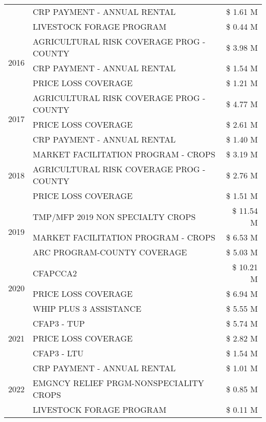 \begin{tabular}{llr}
 & CRP PAYMENT - ANNUAL RENTAL & \$ 1.61 M \\
 & LIVESTOCK FORAGE PROGRAM & \$ 0.44 M \\
\cline{1-3}
\multirow[t]{3}{*}{2016} & AGRICULTURAL RISK COVERAGE PROG - COUNTY & \$ 3.98 M \\
 & CRP PAYMENT - ANNUAL RENTAL & \$ 1.54 M \\
 & PRICE LOSS COVERAGE & \$ 1.21 M \\
\cline{1-3}
\multirow[t]{3}{*}{2017} & AGRICULTURAL RISK COVERAGE PROG - COUNTY & \$ 4.77 M \\
 & PRICE LOSS COVERAGE & \$ 2.61 M \\
 & CRP PAYMENT - ANNUAL RENTAL & \$ 1.40 M \\
\cline{1-3}
\multirow[t]{3}{*}{2018} & MARKET FACILITATION PROGRAM - CROPS & \$ 3.19 M \\
 & AGRICULTURAL RISK COVERAGE PROG - COUNTY & \$ 2.76 M \\
 & PRICE LOSS COVERAGE & \$ 1.51 M \\
\cline{1-3}
\multirow[t]{3}{*}{2019} & TMP/MFP 2019 NON SPECIALTY CROPS & \$ 11.54 M \\
 & MARKET FACILITATION PROGRAM - CROPS & \$ 6.53 M \\
 & ARC PROGRAM-COUNTY COVERAGE & \$ 5.03 M \\
\cline{1-3}
\multirow[t]{3}{*}{2020} & CFAPCCA2 & \$ 10.21 M \\
 & PRICE LOSS COVERAGE & \$ 6.94 M \\
 & WHIP PLUS 3 ASSISTANCE & \$ 5.55 M \\
\cline{1-3}
\multirow[t]{3}{*}{2021} & CFAP3 - TUP & \$ 5.74 M \\
 & PRICE LOSS COVERAGE & \$ 2.82 M \\
 & CFAP3 - LTU & \$ 1.54 M \\
\cline{1-3}
\multirow[t]{3}{*}{2022} & CRP PAYMENT - ANNUAL RENTAL & \$ 1.01 M \\
 & EMGNCY RELIEF PRGM-NONSPECIALITY CROPS & \$ 0.85 M \\
 & LIVESTOCK FORAGE PROGRAM & \$ 0.11 M \\
\cline{1-3}
\bottomrule
\end{tabular}
